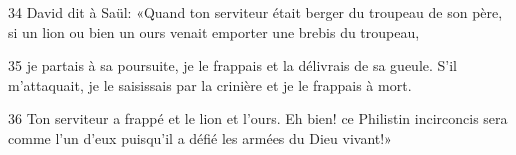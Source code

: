 
34 David dit à Saül: «Quand ton serviteur était berger du troupeau de son père, si un lion ou bien un ours venait emporter une brebis du troupeau,

35 je partais à sa poursuite, je le frappais et la délivrais de sa gueule. S’il m’attaquait, je le saisissais par la crinière et je le frappais à mort.

36 Ton serviteur a frappé et le lion et l’ours. Eh bien! ce Philistin incirconcis sera comme l’un d’eux puisqu’il a défié les armées du Dieu vivant!»